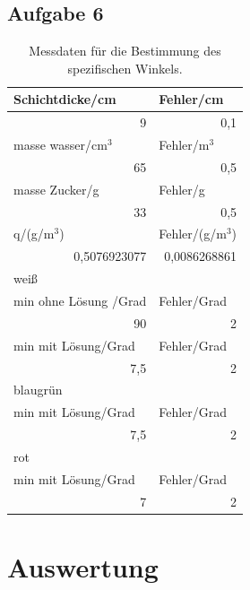 \documentclass[12pt]{scrartcl}
\begin{document}
\subsection{Aufgabe 6}

\begin{table}[htbp]
\caption{Messdaten für die Bestimmung des spezifischen Winkels.}
\begin{center}
\begin{tabular}{|l|l|}
\hline
Schichtdicke/cm & Fehler/cm \\ \hline
\multicolumn{1}{|r|}{9} & \multicolumn{1}{r|}{0,1} \\ \hline
masse wasser/cm$^3$ & Fehler/m$^3$ \\ \hline
\multicolumn{1}{|r|}{65} & \multicolumn{1}{r|}{0,5} \\ \hline
masse Zucker/g & Fehler/g \\ \hline
\multicolumn{1}{|r|}{33} & \multicolumn{1}{r|}{0,5} \\ \hline
q/(g/m$^3$) & Fehler/(g/m$^3$) \\ \hline
\multicolumn{1}{|r|}{0,5076923077} & \multicolumn{1}{r|}{0,0086268861} \\ \hline
weiß &  \\ \hline
min ohne Lösung /Grad & Fehler/Grad \\ \hline
\multicolumn{1}{|r|}{90} & \multicolumn{1}{r|}{2} \\ \hline
min mit Lösung/Grad & Fehler/Grad \\ \hline
\multicolumn{1}{|r|}{7,5} & \multicolumn{1}{r|}{2} \\ \hline
blaugrün &  \\ \hline
min mit Lösung/Grad & Fehler/Grad \\ \hline
\multicolumn{1}{|r|}{7,5} & \multicolumn{1}{r|}{2} \\ \hline
rot &  \\ \hline
min mit Lösung/Grad & Fehler/Grad \\ \hline
\multicolumn{1}{|r|}{7} & \multicolumn{1}{r|}{2} \\ \hline
\end{tabular}
\end{center}
\label{tab:a_6}
\end{table}




\section{Auswertung}
\end{document}
